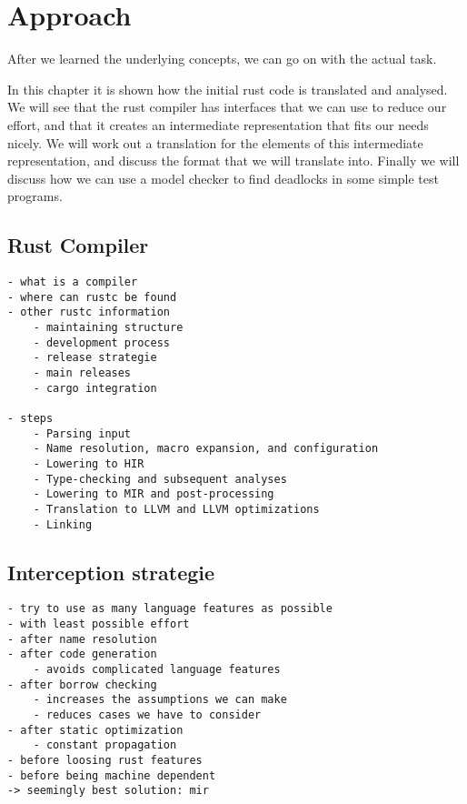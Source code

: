 

\chapter{Approach}
After we learned the underlying concepts, we can go on with the actual task.

In this chapter it is shown how the initial rust code is translated and analysed.
We will see that the rust compiler has interfaces that we can use to reduce our effort,
and that it creates an intermediate representation that fits our needs nicely.
We will work out a translation for the elements of this intermediate representation, 
and discuss the format that we will translate into.
Finally we will discuss how we can use a model checker to find deadlocks in some simple test programs.

\section{Rust Compiler}
\label{app_rust}

\begin{verbatim}
- what is a compiler
- where can rustc be found
- other rustc information
    - maintaining structure
    - development process
    - release strategie
    - main releases
    - cargo integration

- steps
    - Parsing input 
    - Name resolution, macro expansion, and configuration
    - Lowering to HIR
    - Type-checking and subsequent analyses
    - Lowering to MIR and post-processing
    - Translation to LLVM and LLVM optimizations
    - Linking
\end{verbatim}

\section{Interception strategie}
\label{app_intercept}
\begin{verbatim}
- try to use as many language features as possible
- with least possible effort
- after name resolution
- after code generation
    - avoids complicated language features
- after borrow checking
    - increases the assumptions we can make
    - reduces cases we have to consider
- after static optimization
    - constant propagation
- before loosing rust features
- before being machine dependent
-> seemingly best solution: mir
\end{verbatim}

